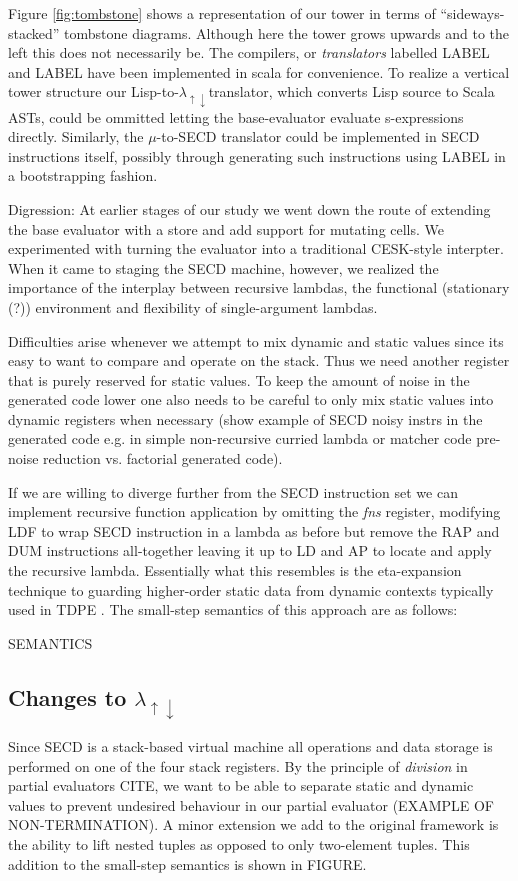 \documentclass[fleqn]{article}
\theoremstyle{definition}
\newcommand{\mslang}{$\lambda_{\uparrow\downarrow}$}
\begin{document}
Figure \ref{fig:tombstone} shows a representation of our tower in terms of ``sideways-stacked'' tombstone diagrams. Although here the tower grows upwards and to the left this does not necessarily be. The compilers, or \textit{translators} labelled LABEL and LABEL have been implemented in scala for convenience. To realize a vertical tower structure our Lisp-to-\mslang translator, which converts Lisp source to Scala ASTs, could be ommitted letting the base-evaluator evaluate s-expressions directly. Similarly, the $\mu$-to-SECD translator could be implemented in SECD instructions itself, possibly through generating such instructions using LABEL in a bootstrapping fashion.


Digression:
At earlier stages of our study we went down the route of extending the base evaluator with a store and add support for mutating cells. We experimented with turning the evaluator into a traditional CESK-style interpter. When it came to staging the SECD machine, however, we realized the importance of the interplay between recursive lambdas, the functional (stationary (?)) environment and flexibility of single-argument lambdas.

Difficulties arise whenever we attempt to mix dynamic and static values since its easy to want to compare and operate on the stack. Thus we need another register that is purely reserved for static values. To keep the amount of noise in the generated code lower one also needs to be careful to only mix static values into dynamic registers when necessary (show example of SECD noisy instrs in the generated code e.g. in simple non-recursive curried lambda or matcher code pre-noise reduction vs. factorial generated code).

If we are willing to diverge further from the SECD instruction set we can implement recursive function application by omitting the \textit{fns} register, modifying LDF to wrap SECD instruction in a lambda as before but remove the RAP and DUM instructions all-together leaving it up to LD and AP to locate and apply the recursive lambda. Essentially what this resembles is the eta-expansion technique to guarding higher-order static data from dynamic contexts typically used in TDPE \cite{danvy1995essence}. The small-step semantics of this approach are as follows:

SEMANTICS

\subsection{Changes to \mslang}
Since SECD is a stack-based virtual machine all operations and data storage is performed on one of the four stack registers. By the principle of \textit{division} in partial evaluators CITE, we want to be able to separate static and dynamic values to prevent undesired behaviour in our partial evaluator (EXAMPLE OF NON-TERMINATION). A minor extension we add to the original framework is the ability to lift nested tuples as opposed to only two-element tuples. This addition to the small-step semantics is shown in FIGURE.
\end{document}
